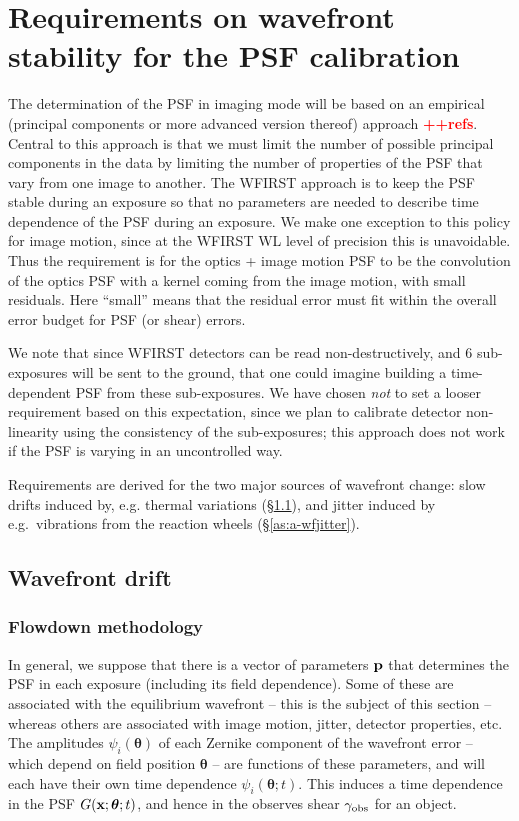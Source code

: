 \documentclass[aps,prd, amsmath,amssymb,superscriptaddress,showkeys,nofootinbib,reprint,preprintnumbers]{revtex4-1}
\newcommand{\verify}[1]{\textcolor{red}{\textbf{{#1}}}}
\begin{document}
\section{Requirements on wavefront stability for the PSF calibration}
\label{app:psf-stability}

The determination of the PSF in imaging mode will be based on an empirical (principal components or more advanced version thereof) approach \verify{++refs}. Central to this approach is that we must limit the number of possible principal components in the data by limiting the number of properties of the PSF that vary from one image to another. The WFIRST approach is to keep the PSF stable during an exposure so that no parameters are needed to describe time dependence of the PSF during an exposure. We make one exception to this policy for image motion, since at the WFIRST WL level of precision this is unavoidable. Thus the requirement is for the optics + image motion PSF to be the convolution of the optics PSF with a kernel coming from the image motion, with small residuals. Here ``small'' means that the residual error must fit within the overall error budget for PSF (or shear) errors.

We note that since WFIRST detectors can be read non-destructively, and 6 sub-exposures will be sent to the ground, that one could imagine building a time-dependent PSF from these sub-exposures. We have chosen {\em not} to set a looser requirement based on this expectation, since we plan to calibrate detector non-linearity using the consistency of the sub-exposures; this approach does not work if the PSF is varying in an uncontrolled way.

Requirements are derived for the two major sources of wavefront change: slow drifts induced by, e.g. thermal variations (\S\ref{as:a-drift}), and jitter induced by e.g.\ vibrations from the reaction wheels (\S\ref{as:a-wfjitter}).

\subsection{Wavefront drift}
\label{as:a-drift}

\subsubsection{Flowdown methodology}
\label{as:drift-method}

In general, we suppose that there is a vector of parameters ${\bf p}$
that determines the PSF in each exposure (including its field
dependence). Some of these are associated with the equilibrium
wavefront -- this is the subject of this section -- whereas others are
associated with image motion, jitter, detector properties, etc. The
amplitudes $\psi_i({\boldsymbol\theta})$ of each Zernike component of
the wavefront error -- which depend on field position
${\boldsymbol\theta}$ -- are functions of these parameters, and will
each have their own time dependence
$\psi_i({\boldsymbol\theta};t)$. This induces a time dependence in the
PSF $G({\bf x};{\boldsymbol\theta};t)$, and hence in the observes
shear $\gamma_{\rm obs}$ for an object.
\end{document}
